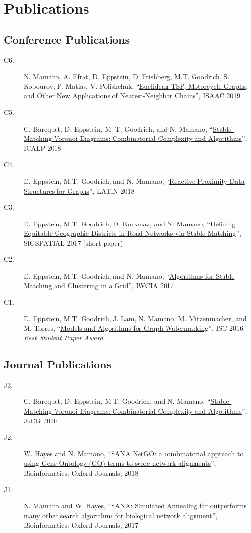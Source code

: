 \documentclass[letterpaper,10pt,oneside]{article}
\begin{document}
\section*{Publications}
\subsection*{Conference Publications}
\begin{description}
\item[C6.] N. Mamano, A. Efrat, D. Eppstein, D. Frishberg, M.T. Goodrich, S. Kobourov, P. Matias, V. Polishchuk, ``\href{https://arxiv.org/pdf/1902.06875.pdf}{Euclidean TSP, Motorcycle Graphs, and Other New Applications of Nearest-Neighbor Chains}'', ISAAC 2019
\item[C5.] G. Barequet, D. Eppstein, M. T. Goodrich, and N. Mamano, ``\href{https://arxiv.org/pdf/1804.09411.pdf}{Stable-Matching Voronoi Diagrams: Combinatorial Complexity and Algorithms}'', ICALP 2018
\item[C4.] D. Eppstein, M.T. Goodrich, and N. Mamano, ``\href{https://arxiv.org/pdf/1803.04555.pdf}{Reactive Proximity Data Structures for Graphs}'', LATIN 2018
\item[C3.] D. Eppstein, M.T. Goodrich, D. Korkmaz, and N. Mamano, ``\href{https://arxiv.org/pdf/1706.09593.pdf}{Defining Equitable Geographic Districts in Road Networks via Stable Matching}'', SIGSPATIAL 2017 (short paper)
\item[C2.] D. Eppstein, M.T. Goodrich, and N. Mamano, ``\href{https://arxiv.org/pdf/1704.02303.pdf}{Algorithms for Stable Matching and Clustering in a Grid}'', IWCIA 2017
\item[C1.] D. Eppstein, M.T. Goodrich, J. Lam, N. Mamano, M. Mitzenmacher, and M. Torres, ``\href{https://arxiv.org/pdf/1605.09425.pdf}{Models and Algorithms for Graph Watermarking}'', ISC 2016 \textit{Best Student Paper Award}\\
\end{description}
\subsection*{Journal Publications}
\begin{description}
\item[J3.] G. Barequet, D. Eppstein, M.T. Goodrich, and N. Mamano, ``\href{https://arxiv.org/pdf/1804.09411.pdf}{Stable-Matching Voronoi Diagrams: Combinatorial Complexity and Algorithms}'', JoCG 2020\\
\item[J2.] W. Hayes and N. Mamano, ``\href{https://academic.oup.com/bioinformatics/article/34/8/1345/4708230}{SANA NetGO: a combinatorial approach to using Gene Ontology (GO) terms to score network alignments}'', Bioinformatics: Oxford Journals, 2018\\
\item[J1.] N. Mamano and W. Hayes, ``\href{https://academic.oup.com/bioinformatics/article/33/14/2156/2996219}{SANA: Simulated Annealing far outperforms many other search algorithms for biological network alignment}'', Bioinformatics: Oxford Journals, 2017\\
\end{description}
\end{document}

